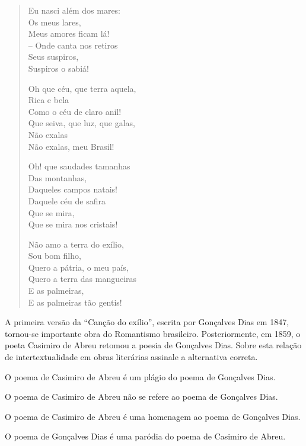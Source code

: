 \begin{myquote}
\begin{verse}
Eu nasci além dos mares: \\
\qquad Os meus lares, \\
Meus amores ficam lá! \\
– Onde canta nos retiros \\
\qquad Seus suspiros, \\
Suspiros o sabiá!

Oh que céu, que terra aquela, \\
\qquad Rica e bela \\
Como o céu de claro anil! \\
Que seiva, que luz, que galas, \\
\qquad Não exalas \\
Não exalas, meu Brasil!

Oh! que saudades tamanhas \\
\qquad Das montanhas, \\
Daqueles campos natais! \\
Daquele céu de safira \\
\qquad Que se mira, \\
Que se mira nos cristais!

Não amo a terra do exílio, \\
\qquad Sou bom filho, \\
Quero a pátria, o meu país, \\
Quero a terra das mangueiras \\
\qquad E as palmeiras, \\
E as palmeiras tão gentis! 

\end{verse}


\end{myquote}

A primeira versão da ``Canção do exílio'', escrita por Gonçalves Dias em 1847,
tornou-se importante obra do Romantismo brasileiro. Posteriormente, em 1859, o
poeta Casimiro de Abreu retomou a poesia de Gonçalves Dias. Sobre esta relação
de intertextualidade em obras literárias assinale a alternativa correta.

\begin{escolha}

  \item O poema de Casimiro de Abreu é um plágio do poema de Gonçalves Dias.

  \item O poema de Casimiro de Abreu não se refere ao poema de Gonçalves Dias.

  \item O poema de Casimiro de Abreu é uma homenagem ao poema de Gonçalves Dias.

  \item O poema de Gonçalves Dias é uma paródia do poema de Casimiro de Abreu.

\end{escolha}

